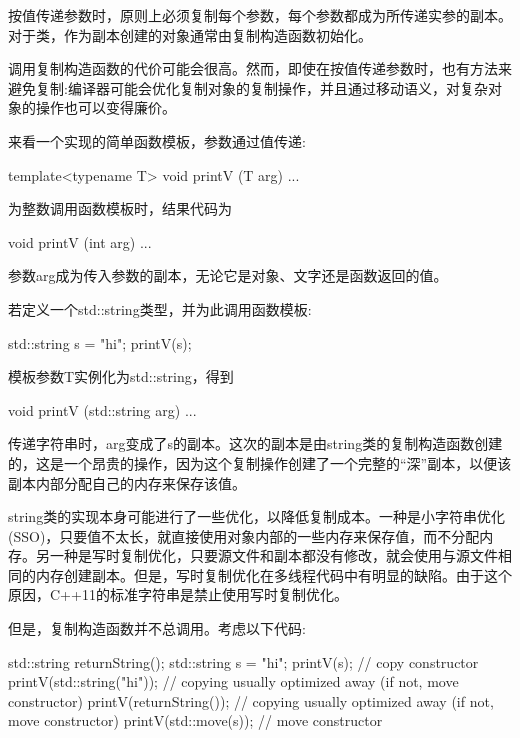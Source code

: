 按值传递参数时，原则上必须复制每个参数，每个参数都成为所传递实参的副本。对于类，作为副本创建的对象通常由复制构造函数初始化。

调用复制构造函数的代价可能会很高。然而，即使在按值传递参数时，也有方法来避免复制:编译器可能会优化复制对象的复制操作，并且通过移动语义，对复杂对象的操作也可以变得廉价。

来看一个实现的简单函数模板，参数通过值传递:

\begin{cpp}
template<typename T>
void printV (T arg) {
	...
}
\end{cpp}

为整数调用函数模板时，结果代码为

\begin{cpp}
void printV (int arg) {
	...
}
\end{cpp}

参数arg成为传入参数的副本，无论它是对象、文字还是函数返回的值。

若定义一个std::string类型，并为此调用函数模板:

\begin{cpp}
std::string s = "hi";
printV(s);
\end{cpp}

模板参数T实例化为std::string，得到

\begin{cpp}
void printV (std::string arg)
{
	...
}
\end{cpp}

传递字符串时，arg变成了s的副本。这次的副本是由string类的复制构造函数创建的，这是一个昂贵的操作，因为这个复制操作创建了一个完整的“深”副本，以便该副本内部分配自己的内存来保存该值。

\begin{notice}string类的实现本身可能进行了一些优化，以降低复制成本。一种是小字符串优化(SSO)，只要值不太长，就直接使用对象内部的一些内存来保存值，而不分配内存。另一种是写时复制优化，只要源文件和副本都没有修改，就会使用与源文件相同的内存创建副本。但是，写时复制优化在多线程代码中有明显的缺陷。由于这个原因，C++11的标准字符串是禁止使用写时复制优化。
\end{notice}

但是，复制构造函数并不总调用。考虑以下代码:

\begin{cpp}
std::string returnString();
std::string s = "hi";
printV(s); // copy constructor
printV(std::string("hi")); // copying usually optimized away (if not, move constructor)
printV(returnString()); // copying usually optimized away (if not, move constructor)
printV(std::move(s)); // move constructor
\end{cpp}

